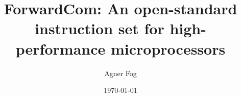 \documentclass[11pt,a4paper,twoside,openright]{report}
\begin{document}
\title{ForwardCom: An open-standard instruction set for high-performance microprocessors}
\author{Agner Fog}
\date{\today}
\maketitle
\RaggedRight

\tableofcontents
\setcounter{secnumdepth}{1}






















\end{document}
